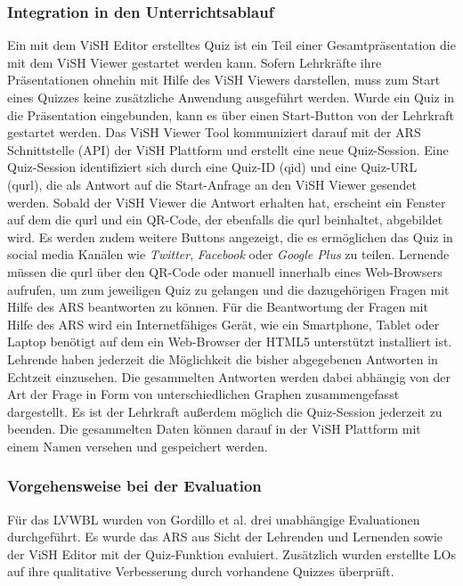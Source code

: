 \documentclass[conference]{IEEEtran}
\begin{document}
\subsubsection{Integration in den Unterrichtsablauf}
Ein mit dem ViSH Editor erstelltes Quiz ist ein Teil einer Gesamtpräsentation die mit dem ViSH Viewer gestartet werden kann. Sofern Lehrkräfte ihre Präsentationen ohnehin mit Hilfe des ViSH Viewers darstellen, muss zum Start eines Quizzes keine zusätzliche Anwendung ausgeführt werden. Wurde ein Quiz in die Präsentation eingebunden, kann es über einen Start-Button von der Lehrkraft gestartet werden. Das ViSH Viewer Tool kommuniziert darauf mit der ARS Schnittstelle (API) der ViSH Plattform und erstellt eine neue Quiz-Session. Eine Quiz-Session identifiziert sich durch eine Quiz-ID (qid) und eine Quiz-URL (qurl), die als Antwort auf die Start-Anfrage an den ViSH Viewer gesendet werden. Sobald der ViSH Viewer die Antwort erhalten hat, erscheint ein Fenster auf dem die qurl und ein QR-Code, der ebenfalls die qurl beinhaltet, abgebildet wird. Es werden zudem weitere Buttons angezeigt, die es ermöglichen das Quiz in social media Kanälen wie \emph{Twitter}, \emph{Facebook} oder \emph{Google Plus} zu teilen. Lernende müssen die qurl über den QR-Code oder manuell innerhalb eines Web-Browsers aufrufen, um zum jeweiligen Quiz zu gelangen und die dazugehörigen Fragen mit Hilfe des ARS beantworten zu können. Für die Beantwortung der Fragen mit Hilfe des ARS wird ein Internetfähiges Gerät, wie ein Smartphone, Tablet oder Laptop benötigt auf dem ein Web-Browser der HTML5 unterstützt installiert ist. Lehrende haben jederzeit die Möglichkeit die bisher abgegebenen Antworten in Echtzeit einzusehen. Die gesammelten Antworten werden dabei abhängig von der Art der Frage in Form von unterschiedlichen Graphen zusammengefasst dargestellt. Es ist der Lehrkraft außerdem möglich die Quiz-Session jederzeit zu beenden. Die gesammelten Daten können darauf in der ViSH Plattform mit einem Namen versehen und gespeichert werden. \cite[p. 6f]{Gordillo2015}
\\
\subsubsection{Vorgehensweise bei der Evaluation}
Für das LVWBL wurden von Gordillo et al. drei unabhängige Evaluationen durchgeführt. Es wurde das ARS aus Sicht der Lehrenden und Lernenden sowie der ViSH Editor mit der Quiz-Funktion evaluiert. Zusätzlich wurden erstellte LOs auf ihre qualitative Verbesserung durch vorhandene Quizzes überprüft. \cite[p. 5ff]{Gordillo2015}
\end{document}
